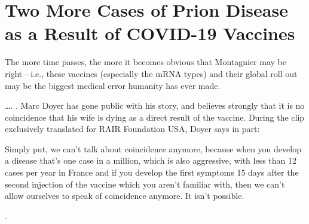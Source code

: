 \chapter{Two More Cases of Prion Disease as a Result of COVID-19 Vaccines}

\begin{refsection}

The more time passes, the more it becomes obvious that Montagnier may be right---i.e., these vaccines (especially the mRNA types) and their global roll out may be the biggest medical error humanity has ever made.

\begin{tcolorbox}[quote]

\dots{}. . Marc Doyer has gone public with his story, and believes strongly that it is no coincidence that his wife is dying as a direct result of the vaccine. During the clip exclusively translated for RAIR Foundation USA, Doyer says in part:\textsuperscript{\cite{url660a1567}}

\end{tcolorbox}

\begin{tcolorbox}[quote]

Simply put, we can't talk about coincidence anymore, because when you develop a disease that's one case in a million, which is also aggressive, with less than 12 cases per year in France and if you develop the first symptoms 15 days after the second injection of the vaccine which you aren't familiar with, then we can't allow ourselves to speak of coincidence anymore. It isn't possible.\textsuperscript{\cite{url660a1567}}

\end{tcolorbox}

\begin{tcolorbox}[quote]

.\textsuperscript{\cite{url660a1567}}

\end{tcolorbox}

\printbibliography[heading=subbibliography]

\end{refsection}